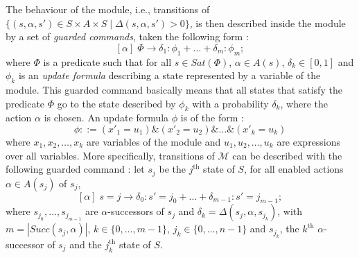 The behaviour of the module, i.e., transitions of $\{ (s, \alpha, s') \in S \times A \times S \; | \; \Delta(s, \alpha, s') > 0 \}$, is then described
inside the module by a set of \textit{guarded commands}, taken the following form :
\[
  [\alpha] \; \Phi \rightarrow \delta_1 : \phi_1 + \dots + \delta_m : \phi_m;
\]
where $\Phi$ is a predicate such that for all $s \in Sat(\Phi)$, $\alpha \in A(s)$, $\delta_k \in [0, 1]$ and $\phi_k$ is an \textit{update formula} describing a state represented by a variable of the module. This guarded command basically means that all states that satisfy the predicate $\Phi$ go to the state  described by $\phi_k$ with a probability $\delta_k$, where the action $\alpha$ is chosen.
An update formula $\phi$ is of the form :
\[\phi::=(x'_1=u_1) \& (x'_2=u_2) \& \dots \& (x'_k=u_k)\]
where $x_1, x_2, \dots, x_k$ are variables of the module and $u_1, u_2, \dots, u_k$ are expressions over all variables.
More specifically, transitions of $\mathcal{M}$ can be described with the following guarded command :
let $s_j$ be the $j^{\text{th}}$ state of $S$, for all enabled actions $\alpha \in A(s_j)$ of $s_j$,
\[
  [\alpha] \; s=j \rightarrow \delta_0 : s'=j_0 + \dots + \delta_{m-1} :  s'=j_{m-1};
\]
where $s_{j_0}, \dots, s_{j_{m-1}}$ are $\alpha$-successors of $s_j$ and $\delta_k = \Delta(s_j, \alpha, s_{j_k})$,
with  $m=|Succ(s_j,\alpha)|$, $k \in \{0, \dots, m-1\}$, $j_k \in \{0, \dots, n-1\}$ and $s_{j_k}$, the $k^\text{th}$ $\alpha$-successor of $s_j$ and the $j_k^\text{th}$ state of $S$. \\

